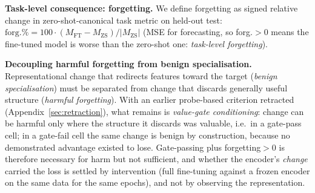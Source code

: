 \textbf{Task-level consequence: forgetting.}
We define forgetting as signed relative change in zero-shot-canonical
task metric on held-out test:
$\text{forg.\%} = 100 \cdot (M_{\text{FT}} - M_{\text{ZS}}) /
|M_{\text{ZS}}|$ (MSE for forecasting, so forg.${>}0$ means the fine-tuned model is
worse than the zero-shot one: \emph{task-level forgetting}).

\textbf{Decoupling harmful forgetting from benign specialisation.}
Representational change that redirects features toward the target
(\emph{benign specialisation}) must be separated from change that discards
generally useful structure (\emph{harmful forgetting}).  With an earlier
probe-based criterion retracted (Appendix~\ref{sec:retraction}), what remains is
\emph{value-gate conditioning}:
change can be harmful only where the structure it discards was valuable, i.e.\ in
a gate-pass cell; in a gate-fail cell the same change is benign by construction,
because no demonstrated advantage existed to lose.  Gate-passing plus
forgetting${>}0$ is therefore necessary for harm but not sufficient, and whether
the encoder's \emph{change} carried the loss is settled by intervention (full
fine-tuning against a frozen encoder on the same data for the same epochs), and
not by observing the representation.
